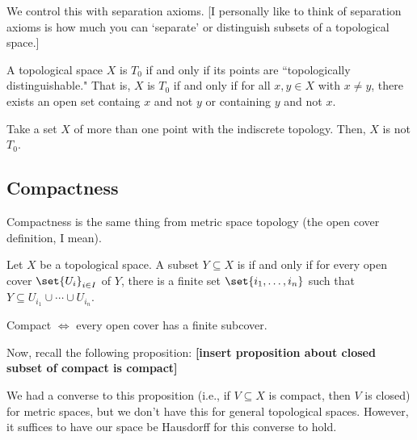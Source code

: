 \documentclass[class=article, crop=false]{standalone}
\begin{document}
We control this with separation axioms. [I personally like to think of separation axioms is how much you can `separate' or distinguish subsets of a topological space.]

\begin{defn}
  A topological space $X$ is $T_0$ if and only if its points are ``topologically distinguishable." That is, $X$ is $T_0$ if and only if for all $x,y \in X$ with $x \neq y$, there exists an open set containg $x$ and not $y$ or containing $y$ and not $x$.
\end{defn}

\begin{ex}
  Take a set $X$ of more than one point with the indiscrete topology. Then, $X$ is not $T_0$.
\end{ex}










\subsection{Compactness}

Compactness is the same thing from metric space topology (the open cover definition, I mean).

\begin{defn}[Compactness]
  Let $X$ be a topological space. A subset $Y \subseteq X$ is  if and only if for every open cover $\set{U_i}_{i \in I}$ of $Y$, there is a finite set $\set{i_1, \ldots, i_n}$ such that $Y \subseteq U_{i_1} \cup \cdots \cup U_{i_n}$.
\end{defn}
\begin{slogan}
  Compact $\iff$ every open cover has a finite subcover.
\end{slogan}

Now, recall the following proposition:
\textbf{[insert proposition about closed subset of compact is compact]}

\begin{rem}
  We had a converse to this proposition (i.e., if $V \subseteq X$ is compact, then $V$ is closed) for metric spaces, but we don't have this for general topological spaces. However, it suffices to have our space be Hausdorff for this converse to hold.
\end{rem}
\end{document}

